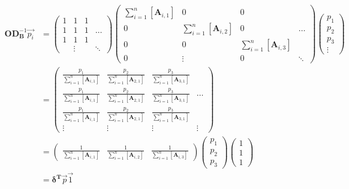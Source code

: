 \documentclass[11pt]{article}
\begin{document}
\begin{align}
  \mathbf{OD}_{\mathbf{B}}^{- 1} \overrightarrow{p_i} & = \left(
  \begin{array}{cccc}
    1 & 1 & 1 & \\
    1 & 1 & 1 & \ldots\\
    1 & 1 & 1 & \\
    & \vdots &  & \ddots
  \end{array} \right) \left(\begin{array}{cccc}
    \sum^n_{i = 1} [\ensuremath{\boldsymbol{A}}_{i, 1}] & 0 & 0 & \\
    0 & \sum^n_{i = 1} [\ensuremath{\boldsymbol{A}}_{i, 2}] & 0 & \ldots\\
    0 & 0 & \sum^n_{i = 1} [\ensuremath{\boldsymbol{A}}_{i, 3}] & \\
    0 & \vdots & 0 & \ddots
  \end{array}\right) \left(\begin{array}{c}
    p_1\\
    p_2\\
    p_3\\
    \vdots
  \end{array}\right) \nonumber \\
  & =  \left(\begin{array}{cccc}
    \frac{p_1}{\sum^n_{i = 1} [\ensuremath{\boldsymbol{A}}_{i, 1}]} & \frac{p_2}{\sum^n_{i =
    1} [\ensuremath{\boldsymbol{A}}_{2, 1}]} & \frac{p_3}{\sum^n_{i = 1} [\ensuremath{\boldsymbol{A}}_{3,
    1}]} & \\
    \frac{p_1}{\sum^n_{i = 1} [\ensuremath{\boldsymbol{A}}_{i, 1}]} & \frac{p_2}{\sum^n_{i =
    1} [\ensuremath{\boldsymbol{A}}_{2, 1}]} & \frac{p_3}{\sum^n_{i = 1} [\ensuremath{\boldsymbol{A}}_{3,
    1}]} & \ldots\\
    \frac{p_1}{\sum^n_{i = 1} [\ensuremath{\boldsymbol{A}}_{i, 1}]} & \frac{p_2}{\sum^n_{i =
    1} [\ensuremath{\boldsymbol{A}}_{2, 1}]} & \frac{p_3}{\sum^n_{i = 1} [\ensuremath{\boldsymbol{A}}_{3,
    1}]} & \\
    \vdots & \vdots & \vdots & \vdots
  \end{array}\right) \nonumber \\
  & =  \left(\begin{array}{ccc}
    \frac{1}{\sum^n_{i = 1} [\ensuremath{\boldsymbol{A}}_{i, 1}]} & \frac{1}{\sum^n_{i = 1}
    [\ensuremath{\boldsymbol{A}}_{i, 2}]} & \frac{1}{\sum^n_{i = 1} [\ensuremath{\boldsymbol{A}}_{i, 3}]}
  \end{array}\right)  \left(\begin{array}{c}
    p_1\\
    p_2\\
    p_3
  \end{array}\right) \left(\begin{array}{c}
    1\\
    1\\
    1
  \end{array}\right)\\
  & = \ensuremath{\boldsymbol{\delta}}^{\ensuremath{\boldsymbol{T}}} \overrightarrow{p} \label{eq:sparse-power-walk}
  \overrightarrow{1}\end{align}
\end{document}
